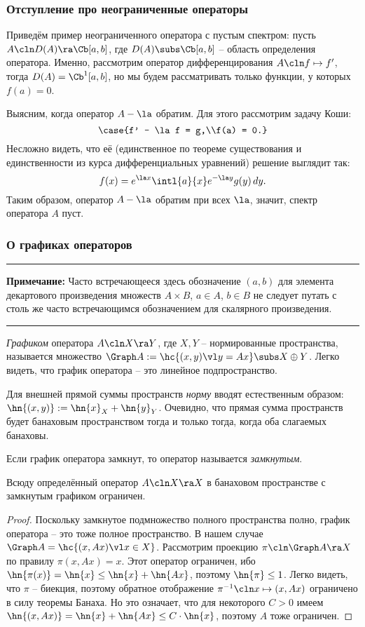 \documentclass[a4paper]{article}
\newcommand{\comment}[1]{\par\vskip2pt\hrule\vskip2pt{\footnotesize \textbf{Примечание:} #1\par}\vskip2pt\hrule\vskip2pt}
\begin{document}
\subsubsection{Отступление про неограниченные операторы}

Приведём пример неограниченного оператора с пустым спектром:
пусть $A\cln D(A) \ra \Cb[a,b]$, где $D(A) \subs \Cb[a,b]$ -- область
определения оператора. Именно, рассмотрим оператор дифференцирования $A\cln f \mapsto f'$,
тогда $D(A) = \Cb^1[a,b]$, но мы будем рассматривать только функции, у которых $f(a) = 0$.

Выясним, когда оператор $A - \la$ обратим. Для этого рассмотрим задачу Коши:
$$
\case{f' - \la f = g,\\f(a) = 0.}
$$
Несложно видеть, что её (единственное по теореме существования и
единственности из курса дифференциальных уравнений)
решение выглядит так:
$$f(x) = e^{\la x}\intl{a}{x}e^{-\la y} g(y)\,dy.$$
Таким образом, оператор $A-\la$ обратим при всех $\la$, значит, спектр оператора $A$ пуст.

\subsubsection{О графиках операторов}
\comment{Часто встречающееся здесь обозначение $(a,b)$ для элемента декартового произведения множеств
$A \times B$, $a \in A$, $b \in B$ не следует путать с столь же часто встречающимся обозначением для
скалярного произведения.}

\begin{df}
\emph{Графиком} оператора $A\cln X \ra Y$, где $X, Y$ -- нормированные пространства, называется множество
$\Graph A := \hc{(x,y) \vl y = Ax} \subs X \oplus Y$. Легко видеть, что график оператора -- это линейное
подпространство.
\end{df}

Для внешней прямой суммы пространств \emph{норму} вводят естественным образом: $\hn{(x,y)} := \hn{x}_X + \hn{y}_Y$.
Очевидно, что прямая сумма пространств будет банаховым пространством тогда и только тогда,
когда оба слагаемых банаховы.

\begin{df}
Если график оператора замкнут, то оператор называется \emph{замкнутым}.
\end{df}

\begin{stm}
Всюду определённый оператор $A\cln X \ra X$ в банаховом пространстве с замкнутым графиком ограничен.
\end{stm}
\begin{proof}
Поскольку замкнутое подмножество полного пространства полно, график оператора -- это
тоже полное пространство. В нашем случае $\Graph A  = \hc{(x, Ax) \vl x \in X}$.
Рассмотрим проекцию $\pi\cln \Graph A \ra X$ по правилу $\pi(x,Ax) = x$. Этот
оператор ограничен, ибо $\hn{\pi(x)} = \hn{x} \le \hn{x} + \hn{Ax}$,
поэтому $\hn{\pi} \le 1$.
Легко видеть, что $\pi$ -- биекция, поэтому обратное отображение $\pi^{-1}\cln x \mapsto (x,Ax)$
ограничено в силу теоремы Банаха. Но это означает, что для некоторого $C> 0$ имеем
$\hn{(x,Ax)} = \hn{x} + \hn{Ax} \le C\cdot \hn{x}$, поэтому $A$ тоже ограничен.
\end{proof}
\end{document}
